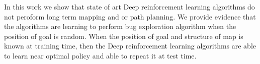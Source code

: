 In this work we show that state of art Deep reinforcement learning algorithms do not peroform long term mapping and or path planning.
We provide evidence that the algorithms are learning to perform bug exploration algorithm when the position of goal is random. When the position of goal and structure of map is known at training time, then the Deep reinforcement learning algorithms
are able to learn near optimal policy and able to repeat it at test time.

